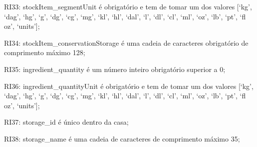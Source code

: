 \begin{description}
	\item RI33: stockItem\_segmentUnit é obrigatório e tem de tomar um dos valores [‘kg’, ‘dag’, ‘hg’, ‘g’, ‘dg’, ‘cg’, ‘mg’, ‘kl’, ‘hl’, ‘dal’, ‘l’, ‘dl’, ‘cl’, ‘ml’, ‘oz’, ‘lb’, ‘pt’, ‘fl oz’, ‘units’];
	\item RI34: stockItem\_conservationStorage é uma cadeia de caracteres obrigatório de comprimento máximo 128;
	\item RI35: ingredient\_quantity é um número inteiro obrigatório superior a 0;
	\item RI36: ingredient\_quantityUnit é obrigatório e tem de tomar um dos valores [‘kg’, ‘dag’, ‘hg’, ‘g’, ‘dg’, ‘cg’, ‘mg’, ‘kl’, ‘hl’, ‘dal’, ‘l’, ‘dl’, ‘cl’, ‘ml’, ‘oz’, ‘lb’, ‘pt’, ‘fl oz’, ‘units’];
	\item RI37: storage\_id é único dentro da casa;
	\item RI38: storage\_name é uma cadeia de caracteres de comprimento máximo 35;
\end{description}